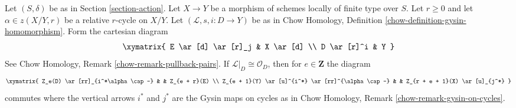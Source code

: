 \begin{lemma}
\label{lemma-action-gysin}
Let $(S, \delta)$ be as in Section \ref{section-action}.
Let $X \to Y$ be a morphism of schemes
locally of finite type over $S$. Let $r \geq 0$ and let
$\alpha \in z(X/Y, r)$ be a relative $r$-cycle on $X/Y$.
Let $(\mathcal{L}, s, i : D \to Y)$ be as in
Chow Homology, Definition \ref{chow-definition-gysin-homomorphism}.
Form the cartesian diagram
$$
\xymatrix{
E \ar[d] \ar[r]_j & X \ar[d] \\
D \ar[r]^i & Y
}
$$
See Chow Homology, Remark \ref{chow-remark-pullback-pairs}.
If $\mathcal{L}|_D \cong \mathcal{O}_D$, then for $e \in \mathbf{Z}$
the diagram
$$
\xymatrix{
Z_e(D) \ar[rr]_{i^*\alpha \cap -} & &
Z_{e + r}(E) \\
Z_{e + 1}(Y) \ar[u]^{i^*} \ar[rr]^{\alpha \cap -} & &
Z_{r + e + 1}(X) \ar[u]_{j^*}
}
$$
commutes where the vertical arrows $i^*$ and $j^*$ are the
Gysin maps on cycles as in
Chow Homology, Remark \ref{chow-remark-gysin-on-cycles}.
\end{lemma}

